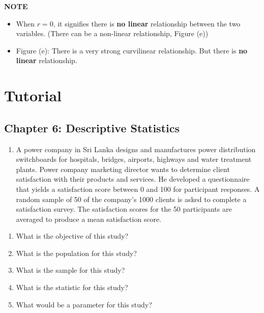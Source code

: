 \documentclass[]{book}
\providecommand{\tightlist}{%
  \setlength{\itemsep}{0pt}\setlength{\parskip}{0pt}}
\begin{document}
\textbf{NOTE}

\begin{itemize}
\tightlist
\item
  When \(r=0\), it signifies there is \textbf{no linear} relationship between the two variables. (There can be a non-linear relationship, Figure (e))
\item
  Figure (e): There is a very strong curvilinear relationship. But there is \textbf{no linear} relationship.
\end{itemize}

\newpage


\hypertarget{tutorial-2}{%
\section{Tutorial}\label{tutorial-2}}

\hypertarget{chapter-6-descriptive-statistics}{%
\subsection*{Chapter 6: Descriptive Statistics}\label{chapter-6-descriptive-statistics}}

\begin{enumerate}
\def\labelenumi{\arabic{enumi}.}
\tightlist
\item
  A power company in Sri Lanka designs and manufactures power distribution switchboards for hospitals, bridges, airports, highways and water treatment plants. Power company marketing director wants to determine client satisfaction with their products and services. He developed a questionnaire that yields a satisfaction score between 0 and 100 for participant responses. A random sample of 50 of the company's 1000 clients is asked to complete a satisfaction survey. The satisfaction scores for the 50 participants are averaged to produce a mean satisfaction score.
\end{enumerate}

\begin{enumerate}
\def\labelenumi{\alph{enumi}.}
\tightlist
\item
  What is the objective of this study?
\item
  What is the population for this study?
\item
  What is the sample for this study?
\item
  What is the statistic for this study?
\item
  What would be a parameter for this study?
\end{enumerate}
\end{document}
